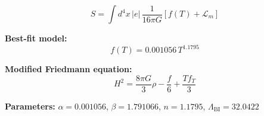 
\begin{equation}
  S = \int d^4x \, |e| \, \frac{1}{16\pi G} \left[ f(T) + \mathcal{L}_m \right]
\end{equation}

\textbf{Best-fit model:}
\begin{equation}
  f(T) = 0.001056 \, T^{1.1795}
\end{equation}

\textbf{Modified Friedmann equation:}
\begin{equation}
  H^2 = \frac{8\pi G}{3} \rho - \frac{f}{6} + \frac{T f_T}{3}
\end{equation}

\textbf{Parameters:}
$\alpha = 0.001056$, \quad
$\beta = 1.791066$, \quad
$n = 1.1795$, \quad
$\Lambda_{\text{BI}} = 32.0422$